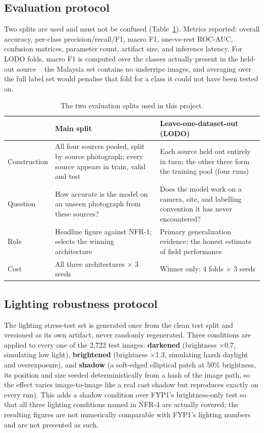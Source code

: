 \documentclass{article}
\begin{document}
\subsection{Evaluation protocol}
\label{sec:protocol}

Two splits are used and must not be confused (Table~\ref{tab:protocol}). Metrics reported: overall
accuracy, per-class precision/recall/F1, macro F1, one-vs-rest ROC-AUC, confusion matrices, parameter
count, artifact size, and inference latency. For LODO folds, macro F1 is computed over the classes
actually present in the held-out source -- the Malaysia set contains no underripe images, and averaging
over the full label set would penalise that fold for a class it could not have been tested on.

\begin{table}[t]
\centering
\caption{The two evaluation splits used in this project.}
\label{tab:protocol}
\begin{tabular}{@{}p{2.6cm}p{5.2cm}p{5.6cm}@{}}
\toprule
 & Main split & Leave-one-dataset-out (LODO) \\
\midrule
Construction & All four sources pooled, split by source photograph; every source appears in train, valid and test & Each source held out entirely in turn; the other three form the training pool (four runs) \\
Question & How accurate is the model on an unseen photograph from these sources? & Does the model work on a camera, site, and labelling convention it has never encountered? \\
Role & Headline figure against NFR-1; selects the winning architecture & Primary generalization evidence; the honest estimate of field performance \\
Cost & All three architectures $\times$ 3 seeds & Winner only: 4 folds $\times$ 3 seeds \\
\bottomrule
\end{tabular}
\end{table}

\subsection{Lighting robustness protocol}

The lighting stress-test set is generated once from the clean test split and versioned as its own
artifact, never randomly regenerated. Three conditions are applied to every one of the 2{,}722 test
images: \textbf{darkened} (brightness $\times$0.7, simulating low light), \textbf{brightened} (brightness
$\times$1.3, simulating harsh daylight and overexposure), and \textbf{shadow} (a soft-edged elliptical
patch at 50\% brightness, its position and size seeded deterministically from a hash of the image path, so
the effect varies image-to-image like a real cast shadow but reproduces exactly on every run). This adds a
shadow condition over FYP1's brightness-only test so that all three lighting conditions named in NFR-4 are
actually covered; the resulting figures are not numerically comparable with FYP1's lighting numbers and
are not presented as such.
\end{document}
